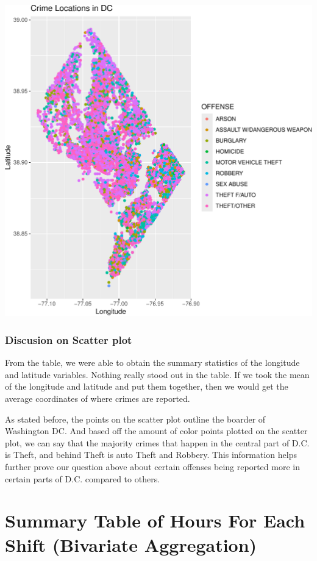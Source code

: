 \documentclass[
]{article}
\begin{document}
\begin{center}\includegraphics{./figures/appendix-plot-scatterplot-1} \end{center}

\subsubsection{Discusion on Scatter
plot}\label{discusion-on-scatter-plot}

From the table, we were able to obtain the summary statistics of the
longitude and latitude variables. Nothing really stood out in the table.
If we took the mean of the longitude and latitude and put them together,
then we would get the average coordinates of where crimes are reported.

As stated before, the points on the scatter plot outline the boarder of
Washington DC. And based off the amount of color points plotted on the
scatter plot, we can say that the majority crimes that happen in the
central part of D.C. is Theft, and behind Theft is auto Theft and
Robbery. This information helps further prove our question above about
certain offenses being reported more in certain parts of D.C. compared
to others.

\section{Summary Table of Hours For Each Shift (Bivariate
Aggregation)}\label{summary-table-of-hours-for-each-shift-bivariate-aggregation}
\end{document}
